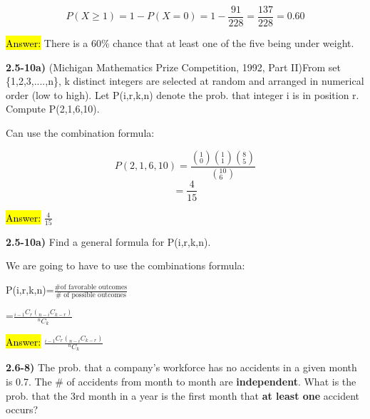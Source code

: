 \documentclass{article}
\begin{document}
$$P(X \ge 1)=1-P(X=0)=1-\frac{91}{228}=\frac{137}{228}=0.60$$

\hl{Answer:} There is a 60\% chance that at least one of the five being under weight.

 

\newpage
\textbf{2.5-10a)} (Michigan Mathematics Prize Competition, 1992, Part II)From set \{1,2,3,....,n\}, k distinct integers are selected at random and arranged in numerical order (low to high). Let P(i,r,k,n) denote the prob. that integer i is in position r.  Compute P(2,1,6,10). 

\vspace{2mm}

Can use the combination formula:

$$P(2,1,6,10)=\frac{(^{1}_{0})(^{1}_{1})(^{8}_{5})}{(^{10}_{6})}$$
$$=\frac{4}{15}$$

\hl{Answer:} $\frac{4}{15}$

 \vspace{3mm}
 
\textbf{2.5-10a)} Find a general formula for P(i,r,k,n).

\vspace{2mm}

We are going to have to use the combinations formula:

\vspace{2mm}

P(i,r,k,n)=$\frac{\# \text{of favorable outcomes}}{\# \text{ of possible outcomes}}$

\vspace{2mm}

\hspace{0.55in}=$\frac{_{i-1}C_{r} (_{n-i}C_{k-r})}{^{n}C_{k}}$

\hl{Answer:} $\frac{_{i-1}C_{r} (_{n-i}C_{k-r})}{^{n}C_{k}}$












\newpage
\textbf{2.6-8)}  The prob. that a company's workforce has no accidents in a given month is 0.7. The \# of accidents from month to month are \textbf{independent}. What is the prob. that the 3rd month in a year is the first month that \textbf{at least one} accident occurs?
\vspace{2mm}
\end{document}
